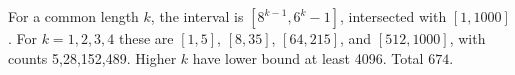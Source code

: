 For a common length $k$, the interval is $[8^{k-1},6^k-1]$, intersected with $[1,1000]$. For $k=1,2,3,4$ these are $[1,5]$, $[8,35]$, $[64,215]$, and $[512,1000]$, with counts 5,28,152,489. Higher $k$ have lower bound at least 4096. Total $\boxed{674}$.
